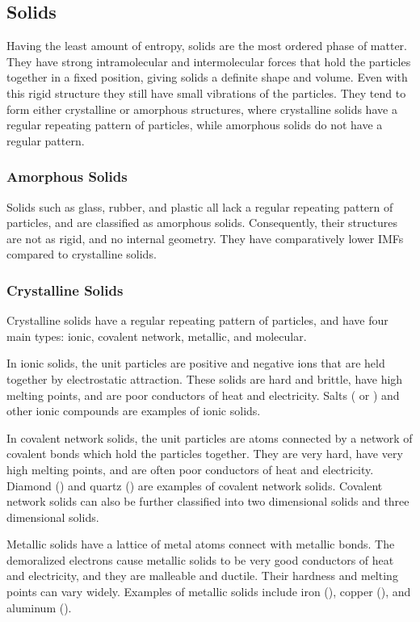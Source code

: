 \subsection{Solids}
Having the least amount of entropy, solids are the most ordered phase of matter. They have strong intramolecular and intermolecular forces that hold the particles together in a fixed position, giving solids a definite shape and volume. Even with this rigid structure they still have small vibrations of the particles. They tend to form either crystalline or amorphous structures, where crystalline solids have a regular repeating pattern of particles, while amorphous solids do not have a regular pattern. 
\subsubsection{Amorphous Solids}
Solids such as glass, rubber, and plastic all lack a regular repeating pattern of particles, and are classified as amorphous solids. Consequently, their structures are not as rigid, and no internal geometry. They have comparatively lower IMFs compared to crystalline solids.
\subsubsection{Crystalline Solids}
Crystalline solids have a regular repeating pattern of particles, and have four main types: ionic, covalent network, metallic, and molecular. 

In ionic solids, the unit particles are positive and negative ions that are held together by electrostatic attraction. These solids are hard and brittle, have high melting points, and are poor conductors of heat and electricity. Salts ( or ) and other ionic compounds are examples of ionic solids.

In covalent network solids, the unit particles are atoms connected by a network of covalent bonds which hold the particles together. They are very hard, have very high melting points, and are often poor conductors of heat and electricity. Diamond () and quartz () are examples of covalent network solids. Covalent network solids can also be further classified into two dimensional solids and three dimensional solids. 

Metallic solids have a lattice of metal atoms connect with metallic bonds. The demoralized electrons cause metallic solids to be very good conductors of heat and electricity, and they are malleable and ductile. Their hardness and melting points can vary widely. Examples of metallic solids include iron (), copper (), and aluminum ().

